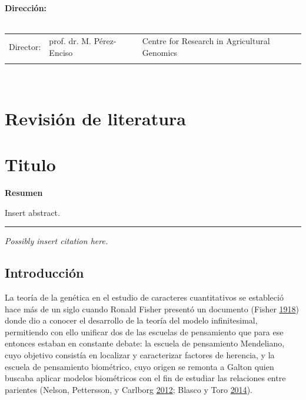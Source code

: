 \documentclass[11pt,spanish,a4paper,oneside,]{book} %
\begin{document}
\clearpage
\thispagestyle{empty}
\noindent\textbf{Dirección:}\\
\\
\noindent\begin{tabular}{@{}lll}

Director:
&  prof. dr. M. Pérez-Enciso & Centre for Research in Agricultural Genomics\\

\\
\end{tabular}\\



{
\hypersetup{linkcolor=black}
\setcounter{tocdepth}{1}
\tableofcontents
}
\mainmatter
\hypertarget{revisiuxf3n-de-literatura}{%
\chapter{Revisión de literatura}\label{revisiuxf3n-de-literatura}}

\hypertarget{section}{%
\section{}\label{section}}

\hypertarget{titulo}{%
\chapter{Titulo}\label{titulo}}

\textbf{Resumen}

\noindent 
Insert abstract.

\begin{center}\rule{0.5\linewidth}{0.5pt}\end{center}

\vspace*{\fill}

\noindent
\emph{Possibly insert citation here.}
\newpage

\hypertarget{intro2}{%
\section{Introducción}\label{intro2}}

La teoría de la genética en el estudio de caracteres cuantitativos se estableció hace más de un siglo cuando Ronald Fisher presentó un documento (Fisher \protect\hyperlink{ref-cite:1}{1918}) donde dio a conocer el desarrollo de la teoría del modelo infinitesimal, permitiendo con ello unificar dos de las escuelas de pensamiento que para ese entonces estaban en constante debate: la escuela de pensamiento Mendeliano, cuyo objetivo consistía en localizar y caracterizar factores de herencia, y la escuela de pensamiento biométrico, cuyo origen se remonta a Galton quien buscaba aplicar modelos biométricos con el fin de estudiar las relaciones entre parientes (Nelson, Pettersson, y Carlborg \protect\hyperlink{ref-cite:2}{2012}; Blasco y Toro \protect\hyperlink{ref-cite:3}{2014}).
\end{document}

